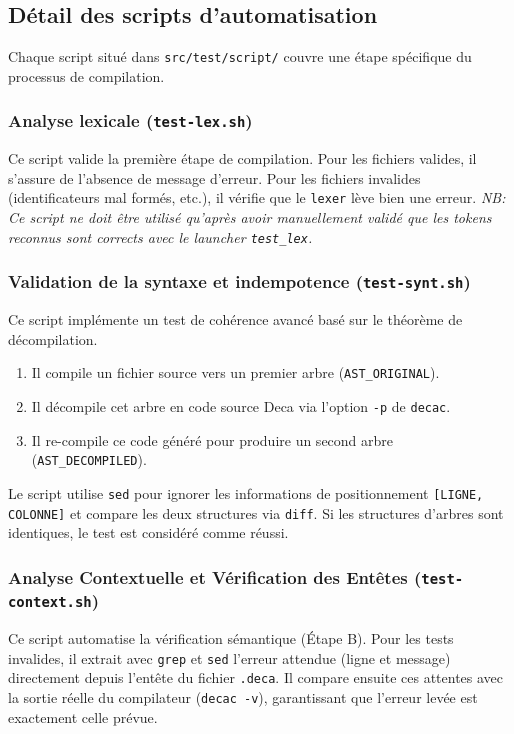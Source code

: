 \subsection{Détail des scripts d'automatisation} \noindent 
Chaque script situé dans \texttt{src/test/script/} couvre une étape spécifique du processus de compilation.

\subsubsection{Analyse lexicale (\texttt{test-lex.sh})} Ce script valide la première étape de compilation. Pour les fichiers valides, il s'assure de l'absence de message d'erreur. Pour les fichiers invalides (identificateurs mal formés, etc.), il vérifie que le \texttt{lexer} lève bien une erreur. 
\noindent \textit{NB: Ce script ne doit être utilisé qu'après avoir manuellement validé que les tokens reconnus sont corrects avec le launcher \texttt{test\_lex}.}

\subsubsection{Validation de la syntaxe et indempotence (\texttt{test-synt.sh})} 
\noindent Ce script implémente un test de cohérence avancé basé sur le théorème de décompilation. 
\begin{enumerate} 
    \item Il compile un fichier source vers un premier arbre (\texttt{AST\_ORIGINAL}). 
    \item Il décompile cet arbre en code source Deca via l'option \texttt{-p} de \texttt{decac}. \item Il re-compile ce code généré pour produire un second arbre (\texttt{AST\_DECOMPILED}). 
\end{enumerate} 
Le script utilise \texttt{sed} pour ignorer les informations de positionnement \texttt{[LIGNE, COLONNE]} et compare les deux structures via \texttt{diff}. Si les structures d'arbres sont identiques, le test est considéré comme réussi.

\subsubsection{Analyse Contextuelle et Vérification des Entêtes (\texttt{test-context.sh})}
\noindent Ce script automatise la vérification sémantique (Étape B). Pour les tests invalides, il extrait avec \texttt{grep} et \texttt{sed} l'erreur attendue (ligne et message) directement depuis l'entête du fichier \texttt{.deca}. Il compare ensuite ces attentes avec la sortie réelle du compilateur (\texttt{decac -v}), garantissant que l'erreur levée est exactement celle prévue. 

